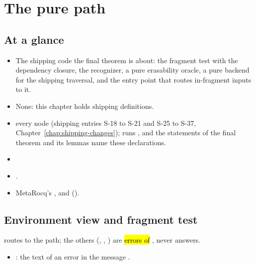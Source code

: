 \chapter{The pure path}\label{chap:pure}

\section*{At a glance}
\begin{itemize}
\item {} The shipping code the final theorem is about: the fragment test with the
  dependency closure, the  recognizer, a pure erasability oracle, a pure backend for
  the shipping traversal, and the entry point that routes in-fragment inputs to it.
\item {} None: this chapter holds shipping definitions.
\item {} \stShipping{} every node (shipping entries S-18 to S-21 and S-25 to S-37,
  Chapter~\ref{chap:shipping-changes});  runs , and the statements
  of the final theorem and its lemmas name these declarations.
\item {} 
\item {} .
\item {} MetaRocq's ,  and 
  ().
\end{itemize}

\section{Environment view and fragment test}\label{sec:pure-closure}

\begin{definition}
  \label{def:Erasure-EraseError}
  \leanok
    routes  to the  path;
  the others (, , ) are \hl{errors of
  }, never answers.
  \begin{itemize}
  \item {}: the text of an error in the message .
  \end{itemize}
\end{definition}

